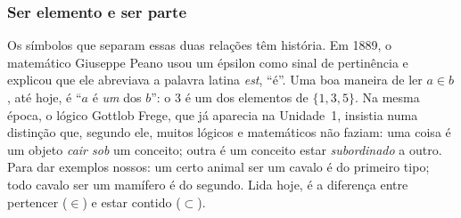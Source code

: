 \subsubsection{Ser elemento e ser parte}
Os símbolos que separam essas duas relações têm história. Em 1889, o matemático Giuseppe Peano usou um épsilon como sinal de pertinência e explicou que ele abreviava a palavra latina \emph{est}, \enquote{é}. Uma boa maneira de ler $a\in b$, até hoje, é \enquote{$a$ é \emph{um} dos $b$}: o 3 é um dos elementos de $\{1,3,5\}$. Na mesma época, o lógico Gottlob Frege, que já aparecia na Unidade~1, insistia numa distinção que, segundo ele, muitos lógicos e matemáticos não faziam: uma coisa é um objeto \emph{cair sob} um conceito; outra é um conceito estar \emph{subordinado} a outro. Para dar exemplos nossos: um certo animal ser um cavalo é do primeiro tipo; todo cavalo ser um mamífero é do segundo. Lida hoje, é a diferença entre pertencer ($\in$) e estar contido ($\subset$).

